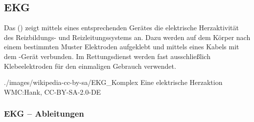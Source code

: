 \subsection{EKG}
\label{topic:ekg}

Das  () zeigt mittels eines
entsprechenden Gerätes die elektrische Herzaktivität des
Reizbildungs- und Reizleitungssystems an. Dazu werden auf
dem Körper nach einem bestimmten Muster Elektroden
aufgeklebt und mittels eines Kabels mit dem -Gerät
verbunden. Im Rettungsdienst werden fast ausschließlich
Klebeelektroden für den einmaligen Gebrauch verwendet. 


{
}
{}
{./images/wikipedia-cc-by-sa/EKG_Komplex}
{Eine elektrische Herzaktion}
{WMC:Hank, CC-BY-SA-2.0-DE}





\subsubsection{EKG -- Ableitungen}
\label{topic:ekg-ableitungen}

